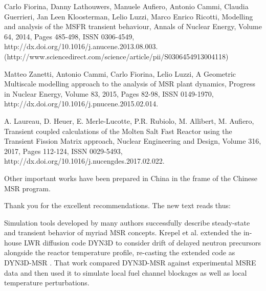 \documentclass[answers,11pt]{exam}
\begin{document}
\begin{questions}
Carlo Fiorina, Danny Lathouwers, Manuele Aufiero, Antonio Cammi, Claudia Guerrieri, Jan Leen Kloosterman, Lelio Luzzi, Marco Enrico Ricotti, Modelling and analysis of the MSFR transient behaviour, Annals of Nuclear Energy, Volume 64, 2014, Pages 485-498, ISSN 0306-4549, http://dx.doi.org/10.1016/j.anucene.2013.08.003.
(http://www.sciencedirect.com/science/article/pii/S0306454913004118)

Matteo Zanetti, Antonio Cammi, Carlo Fiorina, Lelio Luzzi, A Geometric Multiscale modelling approach to the analysis of MSR plant dynamics, Progress in Nuclear Energy, Volume 83, 2015, Pages 82-98, ISSN 0149-1970, http://dx.doi.org/10.1016/j.pnucene.2015.02.014.

A. Laureau, D. Heuer, E. Merle-Lucotte, P.R. Rubiolo, M. Allibert, M. Aufiero, Transient coupled calculations of the Molten Salt Fast Reactor using the Transient Fission Matrix approach, Nuclear Engineering and Design, Volume 316, 2017, Pages 112-124, ISSN 0029-5493, http://dx.doi.org/10.1016/j.nucengdes.2017.02.022.

Other important works have been prepared in China in the frame of the Chinese MSR program.
\begin{solution}
        Thank you for the excellent recommendations. The new text reads thus:


        Simulation tools developed by many authors successfully describe 
        steady-state and
        transient behavior of myriad MSR concepts. Krepel et al. extended 
        the in-house LWR
        diffusion code DYN3D to consider drift of delayed neutron precursors 
        alongside
        the reactor temperature profile, re-casting the extended code as
        DYN3D-MSR \cite{krepel_dyn3d-msr_2007}. That work compared DYN3D-MSR 
        against
        experimental MSRE data and then used it to simulate local fuel 
        channel
        blockages as well as local temperature perturbations. 


\end{solution}
\end{questions}
\end{document}
